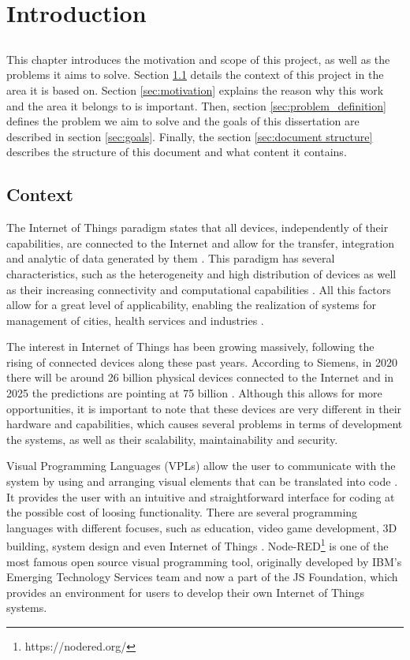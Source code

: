 \chapter{Introduction} \label{chap:intro}

\section*{}

This chapter introduces the motivation and scope of this project, as well as the problems it aims to solve. Section \ref{sec:context} details the context of this project in the area it is based on. Section \ref{sec:motivation} explains the reason why this work and the area it belongs to is important. Then, section \ref{sec:problem_definition} defines the problem we aim to solve and the goals of this dissertation are described in section \ref{sec:goals}. Finally, the section \ref{sec:document structure} describes the structure of this document and what content it contains.

\section{Context} \label{sec:context}

The Internet of Things paradigm states that all devices, independently of their capabilities, are connected to the Internet and allow for the transfer, integration and analytic of data generated by them \cite{Buyya:2016:ITP:3050877}. This paradigm has several characteristics, such as the heterogeneity and high distribution of devices as well as their increasing connectivity and computational capabilities \cite{SoS}. All this factors allow for a great level of applicability, enabling the realization of systems for management of cities, health services and industries \cite{6851114}.
\par The interest in Internet of Things has been growing massively, following the rising of connected devices along these past years. According to Siemens, in 2020 there will be around 26 billion physical devices connected to the Internet and in 2025 the predictions are pointing at 75 billion \cite{tanweer}. Although this allows for more opportunities, it is important to note that these devices are very different in their hardware and capabilities, which causes several problems in terms of development the systems, as well as their scalability, maintainability and security. 
\par Visual Programming Languages (VPLs) allow the user to communicate with the system by using and arranging visual elements that can be translated into code \cite{vpl-book}. It provides the user with an intuitive and straightforward interface for coding at the possible cost of loosing functionality. There are several programming languages with different focuses, such as education, video game development, 3D building, system design and even Internet of Things \cite{survey_vpl_iot}. Node-RED\footnote{https://nodered.org/} is one of the most famous open source visual programming tool, originally developed by IBM’s Emerging Technology Services team and now a part of the JS Foundation, which provides an environment for users to develop their own Internet of Things systems.

